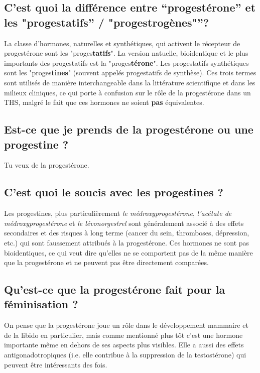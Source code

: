 \documentclass{article}
\begin{document}
\subsection{C'est quoi la différence entre “progestérone” et les "progestatifs” / "progestrogènes"”?}

La classe d'hormones, naturelles et synthétiques, qui activent le récepteur de progestérone sont les "proges\textbf{tatifs}". La version natuelle, bioidentique et le plus importants des progestatifs est la "proges\textbf{térone}". Les progestatifs synthétiques sont les "proges\textbf{tines}" (souvent appelés progestatifs de synthèse). Ces trois termes sont utilisés de manière interchangeable dans la littérature scientifique et dans les milieux cliniques, ce qui porte à confusion sur le rôle de la progestérone dans un THS, malgré le fait que ces hormones ne soient \textbf{pas} équivalentes.

\subsection{Est-ce que je prends de la progestérone ou une progestine ?}

Tu veux de la progestérone.

\subsection{C'est quoi le soucis avec les progestines ?}

Les progestines, plus particulièrement \textit{le médroxyprogestérone}, \textit{l'acétate de médroxyprogestérone} et \textit{le lévonorgestrel} sont généralement associé à des effets secondaires et des risques à long terme (cancer du sein, thromboses, dépression, etc.) qui sont faussement attribués à la progestérone. Ces hormones ne sont pas bioidentiques, ce qui veut dire qu'elles ne se comportent pas de la même manière que la progestérone et ne peuvent pas être directement comparées.

\subsection{Qu'est-ce que la progestérone fait pour la féminisation ?}

On pense que la progestérone joue un rôle dans le développement mammaire et de la libido en particulier, mais comme mentionné plus tôt c'est une hormone importante même en dehors de ses aspects plus visibles. Elle a aussi des effets antigonadotropiques (i.e. elle contribue à la suppression de la testostérone) qui peuvent être intéressants des fois.
\end{document}
